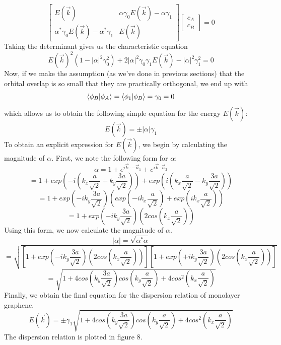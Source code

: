 \documentclass{article}
\begin{document}
$$
\begin{bmatrix}
E(\vec{k}) & \alpha\gamma_{0}E(\vec{k}) - \alpha\gamma_{1}\\
  \alpha^{*}\gamma_{0}E(\vec{k}) - \alpha^{*}\gamma_{1} & E(\vec{k})
\end{bmatrix}
\begin{bmatrix}
c_{A} \\
c_{B}
\end{bmatrix}
= 0
$$
Taking the determinant gives us the characteristic equation
$$E(\vec{k})^{2}(1 - |\alpha|^2\gamma_{0}^{2}) + 2|\alpha|^2\gamma_{0}\gamma_{1}E(\vec{k}) - |\alpha|^2\gamma_{1}^{2} = 0$$
Now, if we make the assumption (as we've done in previous sections) that the orbital overlap is so small that they are practically orthogonal,
we end up with
$$\bra{\phi_{B}}\ket{\phi_{A}} = \bra{\phi_{1}}\ket{\phi_{B}} = \gamma_{0} = 0$$
which allows us to obtain the following simple equation for the energy $E(\vec{k})$:
$$ E(\vec{k}) = \pm |\alpha|\gamma_{1}$$
To obtain an explicit expression for $E(\vec{k})$, we begin by calculating the magnitude of $\alpha$. First, we note the following form for $\alpha$:
$$\alpha = 1 + e^{i\vec{k}\cdot-\vec{a}_{1}} + e^{i\vec{k}\cdot\vec{a}_{2}}$$
$$= 1 + exp\left (-i\left (k_{x}\frac{a}{\sqrt{2}} + k_{y}\frac{3a}{\sqrt{2}}\right )\right ) + exp\left (i\left (k_{x}\frac{a}{\sqrt{2}} - k_{y}\frac{3a}{\sqrt{2}}\right )\right )$$
$$ = 1 + exp\left (-ik_{y}\frac{3a}{\sqrt{2}}\right )\left (exp\left (-ik_{x}\frac{a}{\sqrt{2}}\right ) + exp\left (ik_{x}\frac{a}{\sqrt{2}}\right )\right )$$
$$ = 1 + exp\left (-ik_{y}\frac{3a}{\sqrt{2}}\right )\left ( 2cos\left (k_{x}\frac{a}{\sqrt{2}}\right )\right )$$
Using this form, we now calculate the magnitude of $\alpha$.
$$|\alpha| = \sqrt{\alpha^{*}\alpha}$$
$$= \sqrt{\left [1 + exp\left (-ik_{y}\frac{3a}{\sqrt{2}}\right )\left ( 2cos\left (k_{x}\frac{a}{\sqrt{2}}\right )\right )\right ]
          \left [1 + exp\left (+ik_{y}\frac{3a}{\sqrt{2}}\right )\left ( 2cos\left (k_{x}\frac{a}{\sqrt{2}}\right )\right )\right ]}$$
$$ = \sqrt{1 + 4cos\left ( k_{y}\frac{3a}{\sqrt{2}}\right )cos\left ( k_{y}\frac{a}{\sqrt{2}}\right ) + 4cos^{2}\left (k_{x}\frac{a}{\sqrt{2}}\right ) }$$
Finally, we obtain the final equation for the dispersion relation of monolayer graphene.
$$ E(\vec{k}) = \pm \gamma_{1}\sqrt{1 + 4cos\left ( k_{y}\frac{3a}{\sqrt{2}}\right )cos\left ( k_{y}\frac{a}{\sqrt{2}}\right ) + 4cos^{2}\left (k_{x}\frac{a}{\sqrt{2}}\right ) }$$
The dispersion relation is plotted in figure 8.
\end{document}
